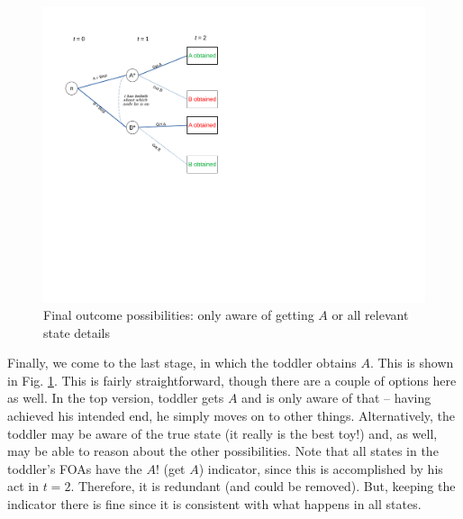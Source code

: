 \documentclass[
11pt,
titlepage,
reqno,
]{article}%
\theoremstyle{definition}
\begin{document}
\begin{figure}[h!]
	\centering
	\includegraphics*[page=20,trim = 0in 0in 2in 0in,scale=.65]{Awareness_Diagrams_All}
	\caption{Final outcome possibilities: only aware of getting $A$ or all relevant state details\label{Diag: p-20}}%
\end{figure}

Finally, we come to the last stage, in which the toddler obtains $A$. This is shown in Fig. \ref{Diag: p-20}. This is fairly straightforward, though there are a couple of options here as well. In the top version, toddler gets $A$ and is only aware of that -- having achieved his intended end, he simply moves on to other things. Alternatively, the toddler may be aware of the true state (it really is the best toy!) and, as well, may be able to reason about the other possibilities. Note that all states in the toddler's FOAs have the $A!$ (get $A$) indicator, since this is accomplished by his act in $t=2$. Therefore, it is redundant (and could be removed). But, keeping the indicator there is fine since it is consistent with what happens in all states. 


\end{document}
